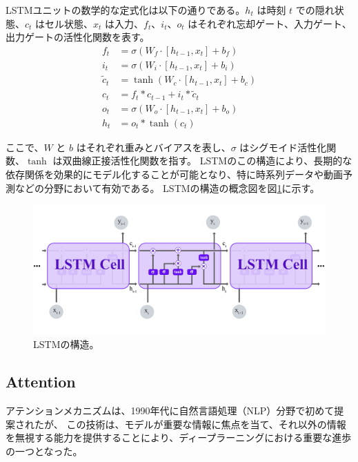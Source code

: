     LSTMユニットの数学的な定式化は以下の通りである。\( h_t \) は時刻 \( t \) での隠れ状態、\( c_t \) はセル状態、\( x_t \) は入力、\( f_t \)、\( i_t \)、\( o_t \) はそれぞれ忘却ゲート、入力ゲート、出力ゲートの活性化関数を表す。
    \begin{align}
      f_t &= \sigma(W_f \cdot [h_{t-1}, x_t] + b_f) \\
      i_t &= \sigma(W_i \cdot [h_{t-1}, x_t] + b_i) \\
      \tilde{c}_t &= \tanh(W_c \cdot [h_{t-1}, x_t] + b_c) \\
      c_t &= f_t * c_{t-1} + i_t * \tilde{c}_t \\
      o_t &= \sigma(W_o \cdot [h_{t-1}, x_t] + b_o) \\
      h_t &= o_t * \tanh(c_t)
    \end{align}
    
    ここで、\( W \) と \( b \) はそれぞれ重みとバイアスを表し、\( \sigma \) はシグモイド活性化関数、\( \tanh \) は双曲線正接活性化関数を指す。
    LSTMのこの構造により、長期的な依存関係を効果的にモデル化することが可能となり、特に時系列データや動画予測などの分野において有効である。
    LSTMの構造の概念図を図\ref{fig:lstm}に示す。
    \begin{figure}[h]
      \centering
      \includegraphics[width=\textwidth]{figures/videoprediction/lstm.jpg}
      \caption{LSTMの構造。}
      \label{fig:lstm}
    \end{figure}
    
    \subsection{Attention}
    アテンションメカニズムは、1990年代に自然言語処理（NLP）分野で初めて提案されたが、
    この技術は、モデルが重要な情報に焦点を当て、それ以外の情報を無視する能力を提供することにより、ディープラーニングにおける重要な進歩の一つとなった。


